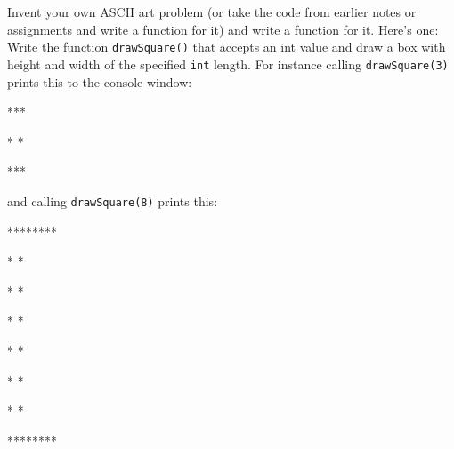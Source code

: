 Invent your own ASCII art problem (or take the code from earlier notes or assignments and write a function for it) and write a function for it. Here's one: Write the function \texttt{drawSquare()} that accepts an int value and draw a box with height and width of the specified \texttt{int} length. For instance calling \texttt{drawSquare(3)} prints this to the console window:



\begin{console}

***

* *

***

\end{console}



and calling \texttt{drawSquare(8)} prints this:



\begin{console}

********

*      *

*      *

*      *

*      *

*      *

*      *

********

\end{console}

